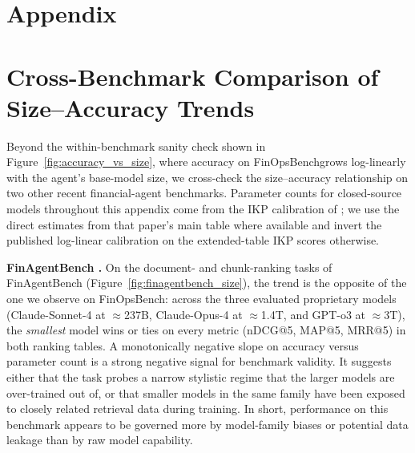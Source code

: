 \documentclass[11pt]{article}
\newcommand{\datasetname}{FinOpsBench}\xspace
\begin{document}



\appendix

\section*{Appendix}

\section{Cross-Benchmark Comparison of Size--Accuracy Trends}
\label{app:cross_benchmark}

Beyond the within-benchmark sanity check shown in Figure~\ref{fig:accuracy_vs_size}, where accuracy on \datasetname grows log-linearly with the agent's base-model size, we cross-check the size--accuracy relationship on two other recent financial-agent benchmarks. Parameter counts for closed-source models throughout this appendix come from the IKP calibration of \citet{li2026incompressible}; we use the direct estimates from that paper's main table where available and invert the published log-linear calibration on the extended-table IKP scores otherwise.

\noindent \textbf{FinAgentBench \citep{choi2025finagentbench}.}
On the document- and chunk-ranking tasks of FinAgentBench (Figure~\ref{fig:finagentbench_size}), the trend is the opposite of the one we observe on \datasetname: across the three evaluated proprietary models (Claude-Sonnet-4 at $\approx$237B, Claude-Opus-4 at $\approx$1.4T, and GPT-o3 at $\approx$3T), the \emph{smallest} model wins or ties on every metric (nDCG@5, MAP@5, MRR@5) in both ranking tables. A monotonically negative slope on accuracy versus parameter count is a strong negative signal for benchmark validity. It suggests either that the task probes a narrow stylistic regime that the larger models are over-trained out of, or that smaller models in the same family have been exposed to closely related retrieval data during training. In short, performance on this benchmark appears to be governed more by model-family biases or potential data leakage than by raw model capability.
\end{document}
